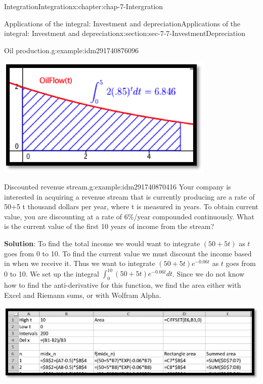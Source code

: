 \documentclass[oneside,10pt,]{book}
\newcommand{\terminology}[1]{\textbf{#1}}
\numberwithin{equation}{section}
\begin{document}
\begin{chapterptx}{Integration}{}{Integration}{}{}{x:chapter:chap-7-Intergration}
\begin{sectionptx}{Applications of the integral: Investment and depreciation}{}{Applications of the integral: Investment and depreciation}{}{}{x:section:sec-7-7-InvestmentDepreciation}
\begin{example}{Oil production.}{g:example:idm291740876096}
\begin{sidebyside}{1}{0.3}{0.3}{0}
\begin{sbspanel}{0.4}
\includegraphics[width=\linewidth]{images/sec7-7-3.png}
\end{sbspanel}%
\end{sidebyside}%
\end{example}
\begin{example}{Discounted revenue stream.}{g:example:idm291740870416}%
Your company is interested in acquiring a revenue stream that is currently producing are a rate of 50+5 t  thousand dollars per year, where t is measured in years.  To obtain current value, you are discounting at a rate of 6\%\slash{}year compounded continuously.  What is the current value of the first 10 years of income from the stream?%
\par
\terminology{Solution}: To find the total income we would want to integrate \((50+5t)\) as \(t\) goes from 0 to 10.  To find the current value we must discount the income based in when we receive it.  Thus we want to integrate \((50+5t) e^{-0.06t}\) as \(t\) goes from 0 to 10.  We set up the integral \(\int_0^{10} (50+5t) e^{-0.06t}  dt\).  Since we do not know how to find the anti-derivative for this function, we find the area either with Excel and Riemann sums, or with Wolfram Alpha.%
\begin{sidebyside}{1}{0.1}{0.1}{0}%
\begin{sbspanel}{0.8}%
\includegraphics[width=\linewidth]{images/sec7-7-4.png}
\end{sbspanel}%
\end{sidebyside}%

\end{example}
\end{sectionptx}
\end{chapterptx}
\end{document}
